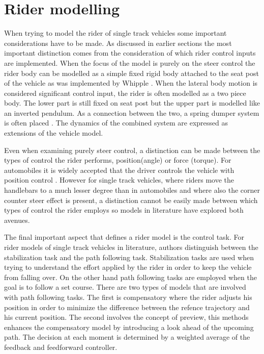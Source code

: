 \section{Rider modelling} \label{sub:rider}
When trying to model the rider of  single track vehicles some important considerations have to be made. As discussed in earlier sections the most important distinction comes from the consideration of which rider control inputs are implemented. When the focus of the model is purely on the steer control the rider body can be modelled as a simple fixed rigid body attached to the seat post of the vehicle as was implemented by Whipple \cite{whipple1899stability}. When the lateral body motion is considered significant control input, the rider  is often modelled as a two piece body. The lower part is still fixed on seat post but the upper part is modelled like an inverted pendulum. As a connection between the two, a spring dumper system is often placed \cite{aoki1999effectiveness,astrom2005bicycle,seffen1999bicycle}. The dynamics of  the combined system are expressed as extensions of the vehicle model.\par
Even when examining purely steer control, a distinction can be made between the types of control the rider performs, position(angle) or force (torque). For automobiles it is widely accepted that the driver controls the vehicle with position control \cite{plochl2007driver,guo1993modelling}. However for single track vehicles, where riders move the handlebars to a much lesser degree than in automobiles and where also the corner counter steer effect is present, a distinction cannot be easily made between which types of control the rider employs so models in literature  have explored both avenues.\par
The final important aspect that defines a rider model is the control task. For rider models of single track vehicles in literature, authors distinguish between  the stabilization task and the path following task.  Stabilization tasks  are used  when  trying to understand the effort applied by the rider in order to keep the vehicle from falling over. On the other hand  path following tasks are employed when the goal is to follow a set course. There are two types of models that are involved with path following tasks. The first is compensatory where the rider adjusts his position in order to minimize the difference between the refence trajectory and his current position. The second involves the concept of preview, this methods enhances the compensatory model by introducing a look ahead of the upcoming path. The decision at each moment is determined by a weighted average of the feedback and feedforward controller.

